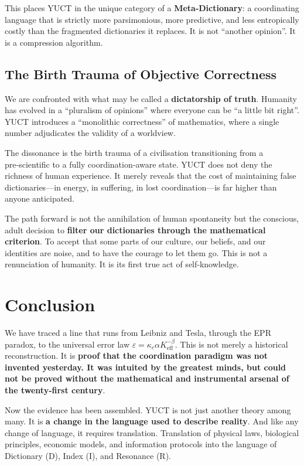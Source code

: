 \documentclass[12pt,a4paper]{article}
\begin{document}
	This places YUCT in the unique category of a \textbf{Meta‑Dictionary}: a coordinating language that is strictly more parsimonious, more predictive, and less entropically costly than the fragmented dictionaries it replaces. It is not ``another opinion''. It is a compression algorithm.
	
	\subsection{The Birth Trauma of Objective Correctness}
	
	We are confronted with what may be called a \textbf{dictatorship of truth}. Humanity has evolved in a ``pluralism of opinions'' where everyone can be ``a little bit right''. YUCT introduces a ``monolithic correctness'' of mathematics, where a single number adjudicates the validity of a worldview.
	
	The dissonance is the birth trauma of a civilisation transitioning from a pre‑scientific to a fully coordination‑aware state. YUCT does not deny the richness of human experience. It merely reveals that the cost of maintaining false dictionaries---in energy, in suffering, in lost coordination---is far higher than anyone anticipated.
	
	The path forward is not the annihilation of human spontaneity but the conscious, adult decision to \textbf{filter our dictionaries through the mathematical criterion}. To accept that some parts of our culture, our beliefs, and our identities are noise, and to have the courage to let them go. This is not a renunciation of humanity. It is its first true act of self‑knowledge.
	
	\section{Conclusion}
	
	We have traced a line that runs from Leibniz and Tesla, through the EPR paradox, to the universal error law \(\varepsilon = \kappa_c \alpha K_{\mathrm{eff}}^{-\beta}\). This is not merely a historical reconstruction. It is \textbf{proof that the coordination paradigm was not invented yesterday. It was intuited by the greatest minds, but could not be proved without the mathematical and instrumental arsenal of the twenty‑first century}.
	
	Now the evidence has been assembled. YUCT is not just another theory among many. It is \textbf{a change in the language used to describe reality}. And like any change of language, it requires translation. Translation of physical laws, biological principles, economic models, and information protocols into the language of Dictionary (D), Index (I), and Resonance (R).
	
\end{document}
